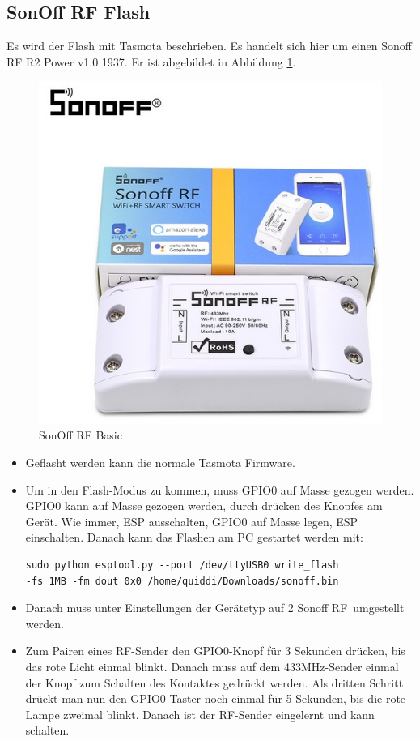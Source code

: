 \documentclass[11pt,fleqn]{book} %
\numberwithin{equation}{section} %
\numberwithin{figure}{section} %
\numberwithin{table}{section} %
\begin{document}
 \subsection{SonOff RF Flash}
 Es wird der Flash mit Tasmota beschrieben. Es handelt sich hier um einen \glqq Sonoff RF R2 Power v1.0 1937\grqq. Er ist abgebildet in Abbildung \ref{pic:sonoff-rf}.
 \begin{figure}[!h]%
\centering
\includegraphics[scale=0.5]{Pictures/Sonoff-rf-basic.jpg}
\caption{SonOff RF Basic\label{pic:sonoff-rf} }
\end{figure}
 \begin{itemize}
     \item Geflasht werden kann die normale Tasmota Firmware.
     \item Um in den Flash-Modus zu kommen, muss GPIO0 auf Masse gezogen werden. GPIO0 kann auf Masse gezogen werden, durch drücken des Knopfes am Gerät. Wie immer, ESP ausschalten, GPIO0 auf Masse legen, ESP einschalten. Danach kann das Flashen am PC gestartet werden mit: \begin{lstlisting}
sudo python esptool.py --port /dev/ttyUSB0 write_flash
-fs 1MB -fm dout 0x0 /home/quiddi/Downloads/sonoff.bin
\end{lstlisting}
\item Danach muss unter Einstellungen der Gerätetyp auf 2 \glqq Sonoff RF\grqq \ umgestellt werden.
\item Zum Pairen eines RF-Sender den GPIO0-Knopf für 3 Sekunden drücken, bis das rote Licht einmal blinkt. Danach muss auf dem 433MHz-Sender einmal der Knopf zum Schalten des Kontaktes gedrückt werden. Als dritten Schritt drückt man nun den GPIO0-Taster noch einmal für 5 Sekunden, bis die rote Lampe zweimal blinkt. Danach ist der RF-Sender eingelernt und kann schalten.
 \end{itemize}
\end{document}
